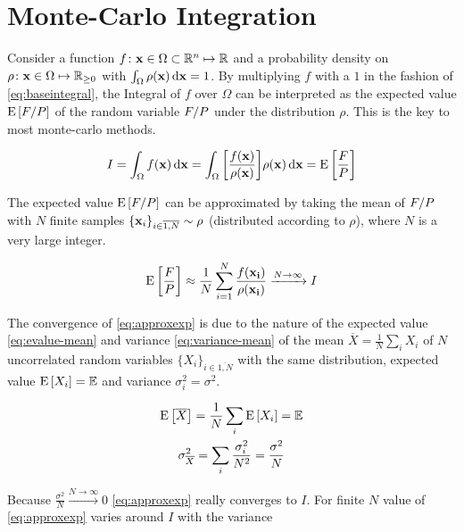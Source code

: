 \section{Monte-Carlo Integration}%
\label{sec:mcint}

Consider a function
\(f\colon \vb{x}\in\Omega\subset\mathbb{R}^n\mapsto\mathbb{R}\) and a
probability density on
\(\rho\colon \vb{x}\in\Omega\mapsto\mathbb{R}_{\geq 0}\) with
\(\int_{\Omega}\rho(\vb{x})\dd{\vb{x}} = 1\).  By multiplying \(f\)
with a \(1\) in the fashion of \cref{eq:baseintegral}, the Integral
of \(f\) over \(\Omega\) can be interpreted as the expected value
\(\operatorname{E}\qty[F/P]\) of the random variable \(F/P\) under the
distribution \(\rho\). This is the key to most monte-carlo methods.

\begin{equation}
  \label{eq:baseintegral}
  I = \int_\Omega f(\vb{x}) \dd{\vb{x}} = \int_\Omega
  \qty[\frac{f(\vb{x})}{\rho(\vb{x})}] \rho(\vb{x}) \dd{\vb{x}} = \operatorname{E}\qty[\frac{F}{P}]
\end{equation}

The expected value \(\operatorname{E}\qty[F/P]\) can be approximated by taking the
mean of \(F/P\) with \(N\) finite samples
\(\{\vb{x}_i\}_{i\in\overline{1,N}}\sim\rho\) (distributed according
to \(\rho\)), where \(N\) is a very large integer.

\begin{equation}
  \label{eq:approxexp}
  \operatorname{E}\qty[\frac{F}{P}] \approx
  \frac{1}{N}\sum_{i=1}^N\frac{f(\vb{x_i})}{\rho(\vb{x_i})}
  \xrightarrow{N\rightarrow\infty} I
\end{equation}

The convergence of \cref{eq:approxexp} is due to the nature of the
expected value \cref{eq:evalue-mean} and
variance \cref{eq:variance-mean} of the mean
\(\overline{X} = \frac{1}{N}\sum_i X_i\) of \(N\) uncorrelated random
variables \(\{X_i\}_{i\in\overline{1,N}}\) with the same distribution,
expected value \(\operatorname{E}\qty[X_i]=\mathbb{E}\) and variance
\(\sigma_i^2 = \sigma^2\).

\begin{gather}
  \operatorname{E}\qty[\overline{X}] = \frac{1}{N}\sum_i\operatorname{E}\qty[X_i] = \mathbb{E} \label{eq:evalue-mean}\\
  \sigma^2_{\overline{X}} = \sum_i\frac{\sigma_i^2}{N^2} =
                            \frac{\sigma^2}{N}  \label{eq:variance-mean}
\end{gather}

Because
\(\frac{\sigma^2}{N}\xrightarrow{N\rightarrow\infty}
0\) \cref{eq:approxexp} really converges to \(I\). For finite \(N\)
value of \cref{eq:approxexp} varies around \(I\) with the variance

